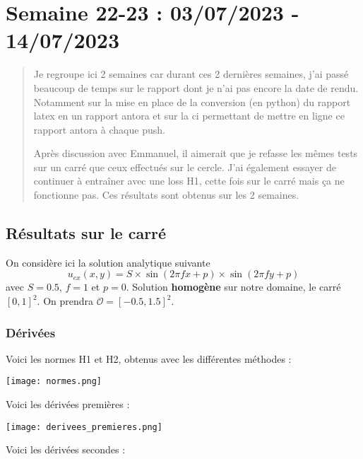 \section{Semaine 22-23 : 03/07/2023 - 14/07/2023}
\graphicspath{{semaines/semaine_22-23/images/}}

\begin{abstract}
	Je regroupe ici 2 semaines car durant ces 2 dernières semaines, j'ai passé beaucoup de temps sur le rapport dont je n'ai pas encore la date de rendu. Notamment sur la mise en place de la conversion (en python) du rapport latex en un rapport antora et sur la ci permettant de mettre en ligne ce rapport antora à chaque push.
	  
	Après discussion avec Emmanuel, il aimerait que je refasse les mêmes tests sur un carré que ceux effectués sur le cercle. J'ai également essayer de continuer à entraîner avec une loss H1, cette fois sur le carré mais ça ne fonctionne pas. Ces résultats sont obtenus sur les 2 semaines.
\end{abstract}

\subsection{Résultats sur le carré}

On considère ici la solution analytique suivante
$$u_{ex}(x,y)=S\times\sin(2\pi fx+p)\times\sin(2\pi fy+p)$$
avec $S=0.5$, $f=1$ et $p=0$. Solution \textbf{homogène} sur notre domaine, le carré $[0,1]^2$. On prendra $\mathcal{O}=[-0.5,1.5]^2.$

\subsubsection*{Dérivées}

Voici les normes H1 et H2, obtenus avec les différentes méthodes :

\begin{minipage}{\linewidth}
	\centering
	\texttt{[image: normes.png]}
\end{minipage}

Voici les dérivées premières :

\begin{minipage}{\linewidth}
	\centering
	\texttt{[image: derivees\_premieres.png]}
\end{minipage}

\newpage

Voici les dérivées secondes :

